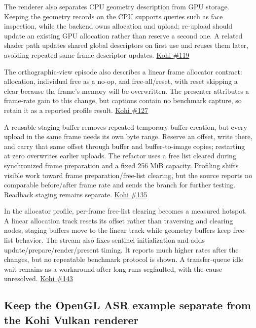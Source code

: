 The renderer also separates CPU geometry description from GPU storage. Keeping the geometry records on the CPU supports queries such as face inspection, while the backend owns allocation and upload; re-upload should update an existing GPU allocation rather than reserve a second one. A related shader path updates shared global descriptors on first use and reuses them later, avoiding repeated same-frame descriptor updates. \href{https://www.youtube.com/watch?v=pPWshwZB7eo}{Kohi \#119}

The orthographic-view episode also describes a linear frame allocator contract: allocation, individual free as a no-op, and free-all/reset, with reset skipping a clear because the frame's memory will be overwritten. The presenter attributes a frame-rate gain to this change, but captions contain no benchmark capture, so retain it as a reported profile result. \href{https://www.youtube.com/watch?v=5i66-I3x9ug}{Kohi \#127}

A reusable staging buffer removes repeated temporary-buffer creation, but every upload in the same frame needs its own byte range. Reserve an offset, write there, and carry that same offset through buffer and buffer-to-image copies; restarting at zero overwrites earlier uploads. The refactor uses a free list cleared during synchronized frame preparation and a fixed 256 MiB capacity. Profiling shifts visible work toward frame preparation/free-list clearing, but the source reports no comparable before/after frame rate and sends the branch for further testing. Readback staging remains separate. \href{https://www.youtube.com/watch?v=zdZP0uQ4Pi8}{Kohi \#135}

In the allocator profile, per-frame free-list clearing becomes a measured hotspot. A linear allocation track resets its offset rather than traversing and clearing nodes; staging buffers move to the linear track while geometry buffers keep free-list behavior. The stream also fixes sentinel initialization and adds update/prepare/render/present timing. It reports much higher rates after the changes, but no repeatable benchmark protocol is shown. A transfer-queue idle wait remains as a workaround after long runs segfaulted, with the cause unresolved. \href{https://www.youtube.com/watch?v=jLSfss8YrXE}{Kohi \#143}

\subsection{Keep the OpenGL ASR example separate from the Kohi Vulkan renderer}\label{06-engine-ii-ch026-keep-the-opengl-asr-example-separate-from-the-kohi-vulkan-renderer}

